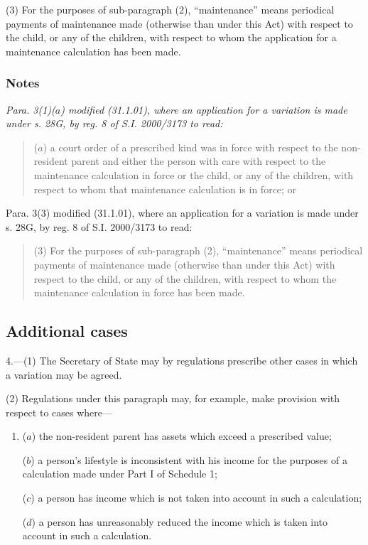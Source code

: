 \documentclass[a4paper]{article}
\newcommand\amendment[1]{\subsubsection*{Notes}{\itshape\frenchspacing\footnotesize #1 \par}}
\begin{document}
{(3) For the purposes of sub-paragraph (2), “maintenance” means periodical payments of maintenance made (otherwise than under this Act) with respect to the child, or any of the children, with respect to whom the application for a maintenance calculation has been made.

\amendment{
Para. 3(1)($a$) modified (31.1.01), where an application for a variation is made under s. 28G, by reg. 8 of S.I. 2000/3173 to read:
\begin{quotation}
($a$) a court order of a prescribed kind was in force with respect to the non-resident parent and either the person with care with respect to the maintenance calculation in force or the child, or any of the children, with respect to whom that maintenance calculation is in force; or
\end{quotation}

Para. 3(3) modified (31.1.01), where an application for a variation is made under s. 28G, by reg. 8 of S.I. 2000/3173 to read:
\begin{quotation}
(3) For the purposes of sub-paragraph (2), “maintenance” means periodical payments of maintenance made (otherwise than under this Act) with respect to the child, or any of the children, with respect to whom the maintenance calculation in force has been made.
\end{quotation}

}

\subsection*{Additional cases}

4.—(1) The Secretary of State may by regulations prescribe other cases in which a variation may be agreed.

(2) Regulations under this paragraph may, for example, make provision with respect to cases where---
\begin{enumerate}\item[]
($a$) the non-resident parent has assets which exceed a prescribed value;

($b$) a person’s lifestyle is inconsistent with his income for the purposes of a calculation made under Part I of Schedule 1;

($c$) a person has income which is not taken into account in such a calculation;

($d$) a person has unreasonably reduced the income which is taken into account in such a calculation.
\end{enumerate}

}
\end{document}

